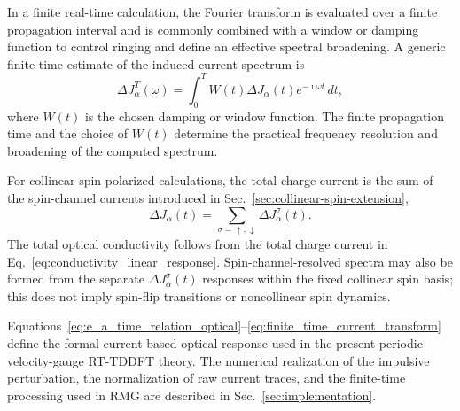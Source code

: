 In a finite real-time calculation, the Fourier transform is evaluated
over a finite propagation interval and is commonly combined with a
window or damping function to control ringing and define an effective
spectral broadening.  A generic finite-time estimate of the induced
current spectrum is
\begin{equation}
  \Delta J_\alpha^{T}(\omega)
  =
  \int_{0}^{T}
  W(t)\Delta J_\alpha(t)e^{-\imath\omega t}\,dt,
  \label{eq:finite_time_current_transform}
\end{equation}
where $W(t)$ is the chosen damping or window function.  The finite
propagation time and the choice of $W(t)$ determine the practical
frequency resolution and broadening of the computed spectrum.

For collinear spin-polarized calculations, the total charge current is
the sum of the spin-channel currents introduced in
Sec.~\ref{sec:collinear-spin-extension},
\begin{equation}
  \Delta J_\alpha(t)
  =
  \sum_{\sigma=\uparrow,\downarrow}
  \Delta J_\alpha^\sigma(t).
  \label{eq:spin_sum_induced_current_optical}
\end{equation}
The total optical conductivity follows from the total charge current in
Eq.~\eqref{eq:conductivity_linear_response}.  Spin-channel-resolved
spectra may also be formed from the separate
$\Delta J_\alpha^\sigma(t)$ responses within the fixed collinear spin
basis; this does not imply spin-flip transitions or noncollinear spin
dynamics.

Equations~\eqref{eq:e_a_time_relation_optical}--\eqref{eq:finite_time_current_transform}
define the formal current-based optical response used in the present
periodic velocity-gauge RT-TDDFT theory.\cite{Luber-rt-tddft}  The
numerical realization of the impulsive perturbation, the normalization
of raw current traces, and the finite-time processing used in RMG are
described in Sec.~\ref{sec:implementation}.
